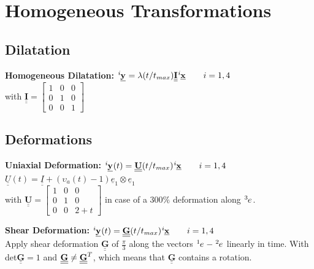 \section{Homogeneous Transformations}
\subsection*{Dilatation}
\smallskip

\textbf{Homogeneous Dilatation:} {$\tensor[^i]{\underline{\mathbf{y}}}{} = \lambda (t/t_{max}) {\underline{\underline{\mathbf{I}}}} \tensor[^i]{\underline{\mathbf{x}}}{} \qquad i = 1,4 $} \\
with $ {\underline{\underline{\mathbf{I}}}} = \left[\begin{array}{ccc}1 & 0 & 0 \\0 & 1 & 0 \\0 & 0 & 1\end{array}\right]$


\subsection*{Deformations}
\smallskip

\textbf{Uniaxial Deformation:}  {$\tensor[^i]{\underline{\mathbf{y}}}{}(t) = \underline{\underline{\mathbf{U}}} (t/t_{max})\tensor[^i]{\underline{\mathbf{x}}}{} \qquad i = 1,4 $} \\
$ \underline{\underline{U}}(t) = \underline{\underline{I}} + (\upsilon_a(t) -1) \underline{e}_1 \otimes \underline{e}_1 $ \\
with $ \underline{\underline{\mathbf{U}}} = \left[\begin{array}{ccc}1 & 0 & 0 \\0 & 1 & 0 \\0 & 0 & 2+t\end{array}\right]$ in case of a $300 \%$ deformation along $\tensor[^3]{e}{}$.
\smallskip

\textbf{Shear Deformation:}  {$\tensor[^i]{\underline{\mathbf{y}}}{}(t) = \underline{\underline{\mathbf{G}}} (t/t_{max})\tensor[^i]{\underline{\mathbf{x}}}{} \qquad i = 1,4 $} \\
Apply shear deformation ${\underline{\underline{\mathbf{G}}}}$ of ${\frac{\pi}{3}}$ along the vectors  $\tensor[^1]{e}{} - \tensor[^2]{e}{}$ linearly in time.
With det$\underline{\underline{\mathbf{G}}} = 1$ and $\underline{\underline{\mathbf{G}}} \neq \tensor[]{\underline{\underline{\mathbf{G}}}}{^T}$, which means that $\underline{\underline{\mathbf{G}}}$ contains a rotation.
\smallskip


